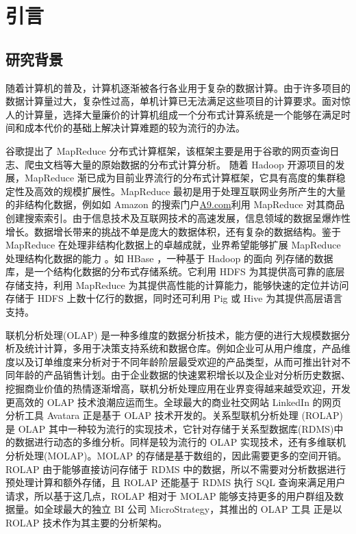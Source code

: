 \chapter{引言}

\section{研究背景}
随着计算机的普及，计算机逐渐被各行各业用于复杂的数据计算。由于许多项目的数据计算量过大，复杂性过高，单机计算已无法满足这些项目的计算要求。面对惊人的计算量，选择大量廉价的计算机组成一个分布式计算系统是一个能够在满足时间和成本代价的基础上解决计算难题的较为流行的办法。

谷歌提出了 MapReduce \cite{dean2008mapreduce}分布式计算框架，该框架主要是用于谷歌的网页查询日志、爬虫文档等大量的原始数据的分布式计算分析。 随着 Hadoop \cite{hadoop}开源项目的发展，MapReduce 渐已成为目前业界流行的分布式计算框架，它具有高度的集群稳定性及高效的规模扩展性。MapReduce 最初是用于处理互联网业务所产生的大量的非结构化数据，例如如 Amazon 的搜索门户\url{A9.com}利用 MapReduce 对其商品创建搜索索引。由于信息技术及互联网技术的高速发展，信息领域的数据呈爆炸性增长。数据增长带来的挑战不单是庞大的数据体积，还有复杂的数据结构。鉴于 MapReduce 在处理非结构化数据上的卓越成就，业界希望能够扩展 MapReduce 处理结构化数据的能力 \cite{hbase} \cite{abouzeid2009hadoopdb} \cite{buck2011scihadoop} \cite{pig} \cite{hive}。如 HBase \cite{hbase}，一种基于 Hadoop 的面向
列存储的数据库，是一个结构化数据的分布式存储系统。它利用 HDFS 为其提供高可靠的底层存储支持，利用 MapReduce 为其提供高性能的计算能力，能够快速的定位并访问存储于 HDFS 上数十亿行的数据，同时还可利用 Pig \cite{pig} 或 Hive \cite{hive} 为其提供高层语言支持。


联机分析处理(OLAP) \cite{chaudhuri1997overview} 是一种多维度的数据分析技术，能方便的进行大规模数据分析及统计计算，多用于决策支持系统和数据仓库。例如企业可从用户维度，产品维度以及订单维度来分析对于不同年龄阶层最受欢迎的产品类型，从而可推出针对不同年龄的产品销售计划。由于企业数据的快速累积增长以及企业对分析历史数据、挖掘商业价值的热情逐渐增高，联机分析处理应用在业界变得越来越受欢迎，开发更高效的 OLAP 技术浪潮应运而生。全球最大的商业社交网站 LinkedIn 的网页分析工具 Avatara \cite{wu2012avatara} 正是基于 OLAP 技术开发的。关系型联机分析处理 (ROLAP) \cite{pedersen2001multidimensional}是 OLAP 其中一种较为流行的实现技术，它针对存储于关系型数据库(RDMS)中的数据进行动态的多维分析。同样是较为流行的 OLAP 实现技术，还有多维联机分析处理(MOLAP)。MOLAP 的存储是基于数组的，因此需要更多的空间开销。ROLAP 由于能够直接访问存储于 RDMS 中的数据，所以不需要对分析数据进行预处理计算和额外存储，且 ROLAP 还能基于 RDMS 执行 SQL 查询来满足用户请求，所以基于这几点，ROLAP 相对于 MOLAP 能够支持更多的用户群组及数据量。如全球最大的独立 BI 公司 MicroStrategy，其推出的 OLAP 工具 \cite{msolapservice} 正是以 ROLAP 技术作为其主要的分析架构。

